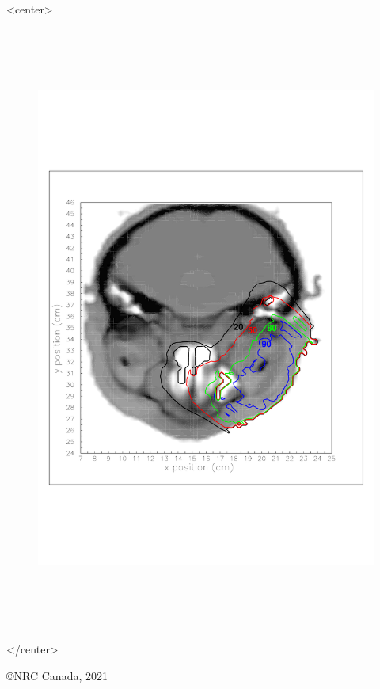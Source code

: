 \documentclass[12pt,twoside]{article}      %
\begin{document}
\begin{center}
\vspace*{-2cm}
\begin{htmlonly}       %
\begin{rawhtml}
<center>
\end{rawhtml}
\end{htmlonly}       %
\begin{figure}[H]
\begin{center}
\includegraphics[height=20cm]{figures/CT_example_msmodel}
\end{center}
\end{figure}
\begin{htmlonly}       %
\begin{rawhtml}
</center>
\end{rawhtml}
\end{htmlonly}       %


\vfill
\copyright NRC Canada, 2021
\end{center}
\end{document}
